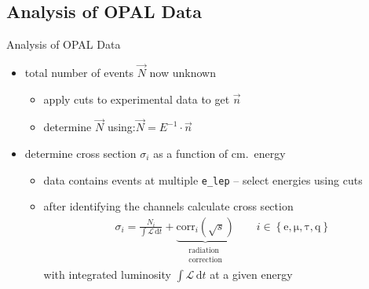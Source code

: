 \documentclass[11pt,xcolor=dvipsnames,professionalfonts]{beamer}
\begin{document}
\subsection{Analysis of OPAL Data}

\begin{frame}{Analysis of OPAL Data}
	\begin{itemize}
		\setlength\itemsep{1.5em}
		\item total number of events $\vec{N}$ now unknown
		\begin{itemize}
			\setlength\itemsep{.5em}
			\item apply cuts to experimental data to get $\vec{n}$
			\item determine $\vec{N}$ using:\quad $\vec{N} = E^{-1} \cdot \vec{n}$
		\end{itemize}
		
		\pause
		
		\item determine cross section $\sigma_i$ as a function of cm.\ energy
		\begin{itemize}
			\setlength\itemsep{.5em}
			\item data contains events at multiple \texttt{e\_lep} -- select energies using cuts
			\item after identifying the channels calculate cross section
			\begin{align*}
				\sigma_i = \frac{N_i}{\int \mathcal{L} \, \mathrm{d}t} + \underbrace{\mathrm{corr}_i(\sqrt{s})}_{\substack{\text{radiation} \\ \text{correction}}} \qquad i \in \left\{ \mathrm{e}, \mathrm{\mu}, \mathrm{\tau}, \mathrm{q} \right\}
			\end{align*}
			with integrated luminosity $\int \mathcal{L} \, \mathrm{d}t$ at a given energy
		\end{itemize}
	\end{itemize}
\end{frame}
\end{document}
